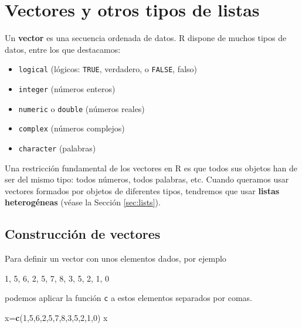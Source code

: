 \documentclass[]{book}
\newenvironment{Shaded}{\begin{snugshade}}{\end{snugshade}}
\newcommand{\DecValTok}[1]{\textcolor[rgb]{0.00,0.00,0.81}{#1}}
\newcommand{\KeywordTok}[1]{\textcolor[rgb]{0.13,0.29,0.53}{\textbf{#1}}}
\newcommand{\NormalTok}[1]{#1}
\providecommand{\tightlist}{%
  \setlength{\itemsep}{0pt}\setlength{\parskip}{0pt}}
\theoremstyle{definition}
\theoremstyle{definition}
\theoremstyle{definition}
\theoremstyle{remark}
\begin{document}
\hypertarget{chap:vect}{%
\chapter{Vectores y otros tipos de listas}\label{chap:vect}}

Un \textbf{vector} es una secuencia ordenada de datos. R dispone de muchos tipos de datos, entre los que destacamos:

\begin{itemize}
\tightlist
\item
  \texttt{logical} (lógicos: \texttt{TRUE}, verdadero, o \texttt{FALSE}, falso)
\item
  \texttt{integer} (números enteros)
\item
  \texttt{numeric} o \texttt{double} (números reales)
\item
  \texttt{complex} (números complejos)
\item
  \texttt{character} (palabras)
\end{itemize}

Una restricción fundamental de los vectores en R es que todos sus objetos han de ser del mismo tipo: todos números, todos palabras, etc.
Cuando queramos usar vectores formados por objetos de diferentes tipos, tendremos que usar \textbf{listas heterogéneas} (véase la Sección \ref{sec:lists}).

\hypertarget{sec:vect}{%
\section{Construcción de vectores}\label{sec:vect}}

Para definir un vector con unos elementos dados, por ejemplo

1, 5, 6, 2, 5, 7, 8, 3, 5, 2, 1, 0

podemos aplicar la función \texttt{c} a estos elementos separados por comas.

\begin{Shaded}
\begin{Highlighting}[]
\NormalTok{x=}\KeywordTok{c}\NormalTok{(}\DecValTok{1}\NormalTok{,}\DecValTok{5}\NormalTok{,}\DecValTok{6}\NormalTok{,}\DecValTok{2}\NormalTok{,}\DecValTok{5}\NormalTok{,}\DecValTok{7}\NormalTok{,}\DecValTok{8}\NormalTok{,}\DecValTok{3}\NormalTok{,}\DecValTok{5}\NormalTok{,}\DecValTok{2}\NormalTok{,}\DecValTok{1}\NormalTok{,}\DecValTok{0}\NormalTok{)}
\NormalTok{x}
\end{Highlighting}
\end{Shaded}
\end{document}

